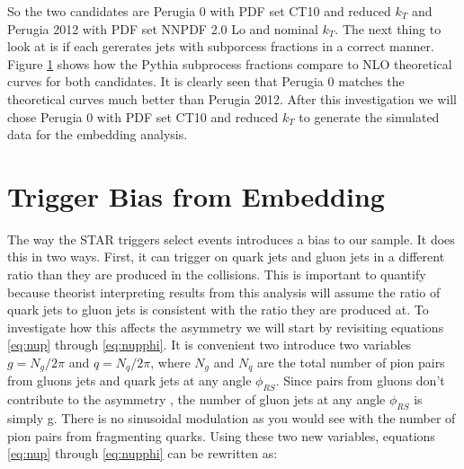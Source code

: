 \documentclass[abstract = on,listof=totoc, bibliography=totoc]{scrreprt}
\newcommand{\phirs}{\phi_{RS}}
\begin{document}
So the two candidates are Perugia 0 with PDF set CT10 and reduced $k_T$ and Perugia 2012 with PDF set NNPDF 2.0 Lo and nominal $k_T$.  The next thing to look at is if each gererates jets with subporcess fractions in a correct manner. Figure \ref{fig:jetSubprocessFractions} shows how the Pythia subprocess fractions compare to NLO theoretical curves for both candidates. It is clearly seen that Perugia 0 matches the theoretical curves much better than Perugia 2012. After this investigation we will chose Perugia 0 with PDF set CT10 and reduced $k_T$ to generate the simulated data for the embedding analysis. 

\begin{figure}
\caption[]{}
\label{fig:jetSubprocessFractions}
\end{figure}

%
%

\chapter{Trigger Bias from Embedding}
\label{ch:trigBias}

The way the STAR triggers select events introduces a bias to our sample. It does this in two ways. First, it can trigger on quark jets and gluon jets in a different ratio than they are produced in the collisions. This is important to quantify because theorist interpreting results from this analysis will assume the ratio of quark jets to gluon jets is consistent with the ratio they are produced at. To investigate how this affects the asymmetry we will start by revisiting equations \ref{eq:nup} through \ref{eq:nupphi}. It is convenient two introduce two variables $g = N_g/2\pi$ and $q = N_q/2\pi$, where $N_g$ and $N_q$ are the total number of pion pairs from gluons jets and quark jets at any angle $\phirs$. Since pairs from gluons don't contribute to the asymmetry \cite{Jaffe:spinProc, bacchettaRadici2}, the number of gluon jets at any angle $\phirs$ is simply g. There is no sinusoidal modulation as you would see with the number of pion pairs from fragmenting quarks. Using these two new variables, equations \ref{eq:nup} through \ref{eq:nupphi} can be rewritten as:
\end{document}
